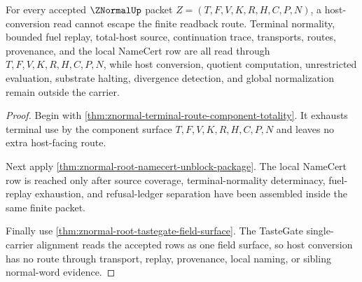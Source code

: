 \begin{theorem}
\label{thm:znormal-host-conversion-nonescape}
For every accepted $\ZNormalUp$ packet $Z=(T,F,V,K,R,H,C,P,N)$, a host-conversion read cannot escape the finite readback route. Terminal normality, bounded fuel replay, total-host source, continuation trace, transports, routes, provenance, and the local NameCert row are all read through $T,F,V,K,R,H,C,P,N$, while host conversion, quotient computation, unrestricted evaluation, substrate halting, divergence detection, and global normalization remain outside the carrier.
\end{theorem}
\begin{proof}
Begin with \autoref{thm:znormal-terminal-route-component-totality}. It exhausts terminal use by the component surface $T,F,V,K,R,H,C,P,N$ and leaves no extra host-facing route.

Next apply \autoref{thm:znormal-root-namecert-unblock-package}. The local NameCert row is reached only after source coverage, terminal-normality determinacy, fuel-replay exhaustion, and refusal-ledger separation have been assembled inside the same finite packet.

Finally use \autoref{thm:znormal-root-tastegate-field-surface}. The TasteGate single-carrier alignment reads the accepted rows as one field surface, so host conversion has no route through transport, replay, provenance, local naming, or sibling normal-word evidence.
\end{proof}
